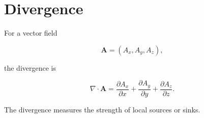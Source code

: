 \section{Divergence}

For a vector field

\[
\mathbf A
=
(A_x,A_y,A_z),
\]

the divergence is

\[
\boxed{
	\nabla\cdot\mathbf A
	=
	\frac{\partial A_x}{\partial x}
	+
	\frac{\partial A_y}{\partial y}
	+
	\frac{\partial A_z}{\partial z}.
}
\]

The divergence measures the strength of local sources or sinks.

